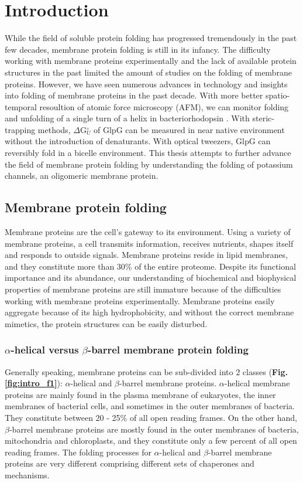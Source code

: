 
\chapter{Introduction}
While the field of soluble protein folding has progressed tremendously in the past few decades, membrane protein folding is still in its infancy. \citep{bowie2005, hong2014} The difficulty working with membrane proteins experimentally and the lack of available protein structures in the past limited the amount of studies on the folding of membrane proteins. However, we have seen numerous advances in technology and insights into folding of membrane proteins in the past decade. With more better spatio-temporal resoultion of atomic force microscopy (AFM), we can monitor folding and unfolding of a single turn of a helix in bacteriorhodopsin \citep{yu2017}. With steric-trapping methods, $\Delta$G$^{\circ}_{U}$ of GlpG can be measured in near native environment without the introduction of denaturants. \citep{guo2016} With optical tweezers, GlpG can reversibly fold in a bicelle environment. \citep{min2015} This thesis attempts to further advance the field of membrane protein folding by understanding the folding of potassium channels, an oligomeric membrane protein.

\section{Membrane protein folding}
Membrane proteins are the cell's gateway to its environment. Using a variety of membrane proteins, a cell transmits information, receives nutrients, shapes itself and responds to outside signals. Membrane proteins reside in lipid membranes, and they constitute more than 30\% of the entire proteome. Despite its functional importance and its abundance, our understanding of biochemical and biophysical properties of membrane proteins are still immature because of the difficulties working with membrane proteins experimentally. Membrane proteins easily aggregate because of its high hydrophobicity, and without the correct membrane mimetics, the protein structures can be easily disturbed.

\subsection{$\alpha$-helical versus $\beta$-barrel membrane protein folding}
Generally speaking, membrane proteins can be sub-divided into 2 classes (\textbf{Fig. \ref{fig:intro_f1}}): $\alpha$-helical and $\beta$-barrel membrane proteins. $\alpha$-helical membrane proteins are mainly found in the plasma membrane of eukaryotes, the inner membranes of bacterial cells, and sometimes in the outer membranes of bacteria. They constitute between 20 - 25\% of all open reading frames. On the other hand, $\beta$-barrel membrane proteins are mostly found in the outer membranes of bacteria, mitochondria and chloroplasts, and they constitute only a few percent of all open reading frames. The folding processes for $\alpha$-helical and $\beta$-barrel membrane proteins are very different comprising different sets of chaperones and mechanisms.

